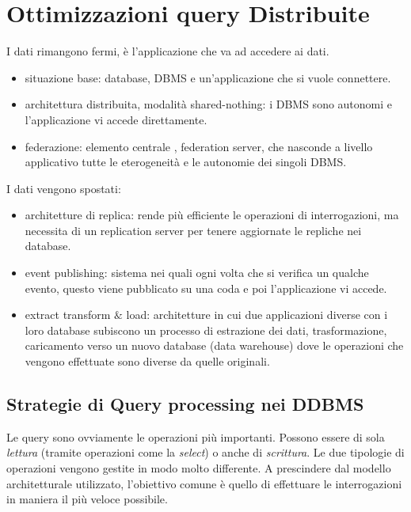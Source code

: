 \section{Ottimizzazioni query Distribuite}
I dati rimangono fermi, è l’applicazione che va ad accedere ai dati. 
\begin{itemize}
    \item situazione base: database, DBMS e un'applicazione che si vuole connettere.
    \item architettura distribuita, modalità shared-nothing: i DBMS sono autonomi e l'applicazione vi accede direttamente. 
    \item federazione: elemento centrale , federation server, che nasconde a livello applicativo tutte le eterogeneità e le autonomie dei singoli DBMS.
\end{itemize}  
I dati vengono spostati:
\begin{itemize}
    \item architetture di replica: rende più efficiente le operazioni di interrogazioni, ma necessita di un replication server per tenere aggiornate le repliche nei database.
    \item event publishing: sistema nei quali ogni volta che si verifica un qualche evento, questo viene pubblicato su una coda e poi l’applicazione vi accede.
    \item extract transform $\&$ load: architetture in cui due applicazioni diverse con i loro database subiscono un processo di estrazione dei dati, trasformazione, caricamento verso un nuovo database (data warehouse) dove le operazioni che vengono effettuate sono diverse da quelle originali.
\end{itemize}  

\subsection{Strategie di Query processing nei DDBMS}
Le query sono ovviamente le operazioni più importanti. Possono essere di sola \textit{lettura} (tramite operazioni come la \textit{select}) o anche di \textit{scrittura}. Le due tipologie di operazioni vengono gestite in modo molto differente. A prescindere dal modello architetturale utilizzato, l’obiettivo comune è quello di effettuare le interrogazioni in maniera il più veloce possibile.

